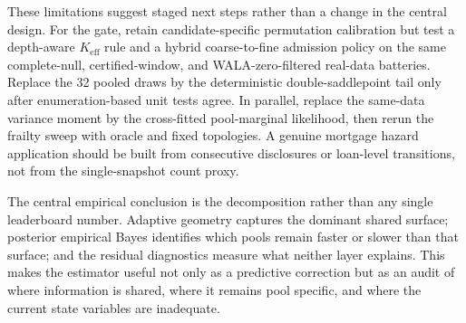 \documentclass[11pt]{article}
\begin{document}
These limitations suggest staged next steps rather than a change in the central design. For the gate,
retain candidate-specific permutation calibration but test a depth-aware $K_{\mathrm{eff}}$ rule and a
hybrid coarse-to-fine admission policy on the same complete-null, certified-window, and WALA-zero-filtered
real-data batteries. Replace the 32 pooled draws by the deterministic double-saddlepoint tail only after
enumeration-based unit tests agree. In parallel, replace the same-data variance moment by the cross-fitted
pool-marginal likelihood, then rerun the frailty sweep with oracle and fixed topologies. A genuine mortgage
hazard application should be built from consecutive disclosures or loan-level transitions, not from the
single-snapshot count proxy.

The central empirical conclusion is the decomposition rather than any single leaderboard number.
Adaptive geometry captures the dominant shared surface; posterior empirical Bayes identifies which
pools remain faster or slower than that surface; and the residual diagnostics measure what neither
layer explains. This makes the estimator useful not only as a predictive correction but as an audit
of where information is shared, where it remains pool specific, and where the current state variables
are inadequate.
\end{document}
